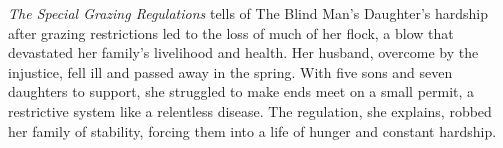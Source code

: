 \textit{The Special Grazing Regulations} tells of The Blind Man's Daughter's hardship after grazing restrictions led to the loss of much of her flock, a blow that devastated her family's livelihood and health. Her husband, overcome by the injustice, fell ill and passed away in the spring. With five sons and seven daughters to support, she struggled to make ends meet on a small permit, a restrictive system like a relentless disease. The regulation, she explains, robbed her family of stability, forcing them into a life of hunger and constant hardship.
